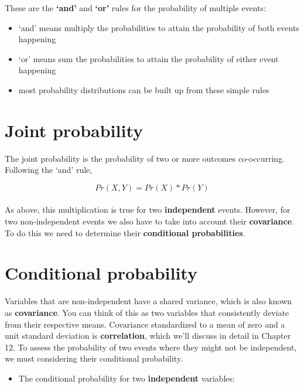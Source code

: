 \documentclass[]{book}
\providecommand{\tightlist}{%
  \setlength{\itemsep}{0pt}\setlength{\parskip}{0pt}}
\begin{document}
These are the \textbf{`and'} and \textbf{`or'} rules for the probability of multiple events:

\begin{itemize}
\tightlist
\item
  `and' means multiply the probabilities to attain the probability of both events happening
\item
  `or' means sum the probabilities to attain the probability of either event happening
\item
  most probability distributions can be built up from these simple rules
\end{itemize}

\hypertarget{joint-probability}{%
\section{Joint probability}\label{joint-probability}}

The joint probability is the probability of two or more outcomes co-occurring. Following the `and' rule,

\[Pr(X,Y) = Pr(X) * Pr(Y)\]\\

As above, this multiplication is true for two \textbf{independent} events. However, for two non-independent events we also have to take into account their \textbf{covariance}. To do this we need to determine their \textbf{conditional probabilities}.

\hypertarget{conditional-probability}{%
\section{Conditional probability}\label{conditional-probability}}

Variables that are non-independent have a shared variance, which is also known as \textbf{covariance}. You can think of this as two variables that consistently deviate from their respective means. Covariance standardized to a mean of zero and a unit standard deviation is \textbf{correlation}, which we'll discuss in detail in Chapter 12. To assess the probability of two events where they might not be independent, we must considering their conditional probability.

\begin{itemize}
\tightlist
\item
  The conditional probability for two \textbf{independent} variables:
\end{itemize}
\end{document}
